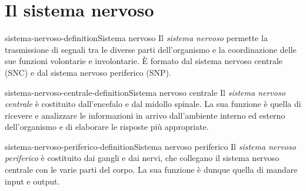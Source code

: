 \documentclass[preview]{standalone}
\begin{document}
\genpage

\section{Il sistema nervoso}

\begin{snippetdefinition}{sistema-nervoso-definition}{Sistema nervoso}
    Il \textit{sistema nervoso} permette la trasmissione di segnali tra le diverse parti dell'organismo e
    la coordinazione delle sue funzioni volontarie e involontarie. È formato dal sistema nervoso
    centrale (SNC) e dal sistema nervoso periferico (SNP).
\end{snippetdefinition}

\begin{snippetdefinition}{sistema-nervoso-centrale-definition}{Sistema nervoso centrale}
    Il \textit{sistema nervoso centrale} è costituito dall'encefalo e dal midollo spinale.
    La sua funzione è quella di ricevere e analizzare le informazioni in
    arrivo dall'ambiente interno ed esterno dell'organismo e di elaborare le risposte più appropriate.
\end{snippetdefinition}

\begin{snippetdefinition}{sistema-nervoso-periferico-definition}{Sistema nervoso periferico}
    Il \textit{sistema nervoso periferico} è costituito dai 
    gangli e dai nervi, che collegano il sistema nervoso centrale
    con le varie parti del corpo.
    La sua funzione è dunque quella di mandare input e output.
\end{snippetdefinition}
\end{document}
